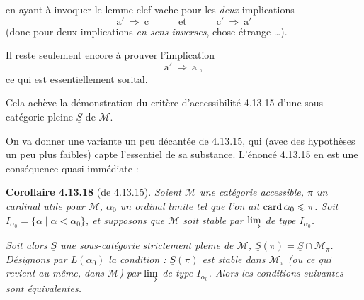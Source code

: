  en ayant à invoquer le lemme-clef vache pour les \textit{deux} implications
\[
\mathrm{a}' \ \Longrightarrow \ \mathrm{c} \qquad\quad \text{et} \qquad\quad \mathrm{c}' \ \Longrightarrow \ \mathrm{a}'
\]
(donc pour deux implications \textit{en sens inverses}, chose étrange \dots).


Il reste seulement encore à prouver l'implication
\[
\mathrm{a}' \ \Longrightarrow \ \mathrm{a} \; ,
\]
ce qui est essentiellement sorital.

Cela achève la démonstration du critère d'accessibilité 4.13.15 d'une sous-catégorie pleine $\underline{S}$ de $\mathcal{M}$.

On va donner une variante un peu décantée de 4.13.15, qui (avec des hypothèses un peu plus faibles) capte l'essentiel de sa substance. L'énoncé 4.13.15 en est une conséquence quasi immédiate :



\textbf{Corollaire 4.13.18} (de 4.13.15). \textit{Soient $\mathcal{M}$ une catégorie accessible, $\pi$ un cardinal utile pour $\mathcal{M}$, $\alpha_0$ un \textup{ordinal limite} tel que l'on ait $\operatorname{card}\alpha_0 \leqslant \pi$. Soit $I_{\alpha_0} = \{\alpha \mid \alpha < \alpha_0\}$, et supposons que $\mathcal{M}$ soit stable par $\varinjlim$ de type $I_{\alpha_0}$.}

\textit{Soit alors $\underline{S}$ une sous-catégorie strictement pleine de $\mathcal{M}$, $\underline{S}(\pi) = \underline{S}\cap\mathcal{M}_\pi$. Désignons par $L(\alpha_0)$ la condition : $\underline{S}(\pi)$ est stable dans $\mathcal{M}_\pi$ (ou ce qui revient au même, dans $\mathcal{M}$) par $\varinjlim$ de type $I_{\alpha_0}$. Alors les conditions suivantes sont équivalentes.}

